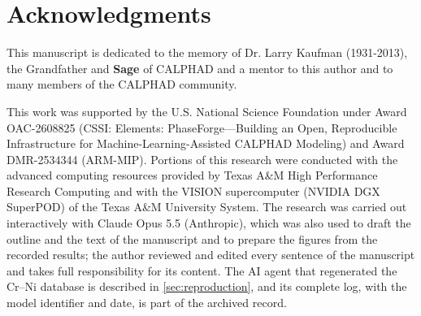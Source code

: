 \section*{Acknowledgments}
This manuscript is dedicated to the memory of Dr. Larry Kaufman (1931-2013), the Grandfather and \textbf{Sage} of CALPHAD and a mentor to this author and to many members of the CALPHAD community.

This work was supported by the U.S. National Science Foundation under Award OAC-2608825 (CSSI: Elements: PhaseForge---Building an Open, Reproducible Infrastructure for Machine-Learning-Assisted CALPHAD Modeling) and Award DMR-2534344 (ARM-MIP). Portions of this research were conducted with the advanced computing resources provided by Texas A\&M High Performance Research Computing and with the VISION supercomputer (NVIDIA DGX SuperPOD) of the Texas A\&M University System. The research was carried out interactively with Claude Opus 5.5 (Anthropic), which was also used to draft the outline and the text of the manuscript and to prepare the figures from the recorded results; the author reviewed and edited every sentence of the manuscript and takes full responsibility for its content. The AI agent that regenerated the Cr--Ni database is described in \cref{sec:reproduction}, and its complete log, with the model identifier and date, is part of the archived record.
